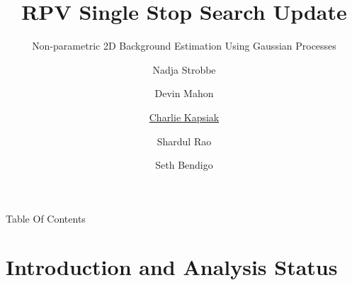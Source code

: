 \documentclass[10pt]{beamer}
\author[Charlie Kapsiak (UMN Single Stop Group) ]{
  Nadja Strobbe\inst{1} \and
  Devin Mahon\inst{1} \and
  \underline{Charlie Kapsiak}\inst{1} \and
  Shardul Rao\inst{1} \and
  Seth Bendigo\inst{1}
}
\institute{\inst{1}University of Minnesota}
\title[Single Stop Update]{RPV Single Stop Search Update}
\subtitle{Non-parametric 2D Background Estimation Using Gaussian Processes}
\begin{document}
\begin{frame}
  \maketitle
\end{frame}

\begin{frame}{Table Of Contents}
  \tableofcontents
\end{frame}

%   
%     
%   
%   
%   
%   

\section[Intro]{Introduction and Analysis Status}
\end{document}
